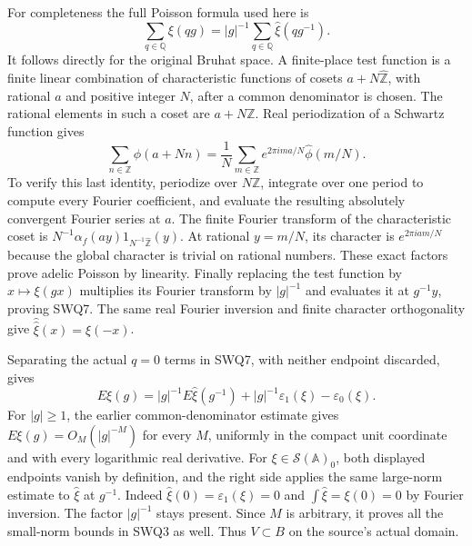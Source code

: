 \documentclass[11pt]{article}
\begin{document}
For completeness the full Poisson formula used here is
\begin{equation}\tag{SWQ7}
 \sum_{q\in\mathbb Q}\xi(qg)
   =|g|^{-1}\sum_{q\in\mathbb Q}\widehat\xi(qg^{-1}).
\end{equation}
It follows directly for the original Bruhat space. A finite-place
test function is a finite linear combination of characteristic
functions of cosets $a+N\widehat{\mathbb Z}$, with rational $a$ and
positive integer $N$, after a common denominator is chosen. The
rational elements in such a coset are $a+N\mathbb Z$. Real
periodization of a Schwartz function gives
\[
 \sum_{n\in\mathbb Z}\phi(a+Nn)
  =\frac1N\sum_{m\in\mathbb Z}
       e^{2\pi i ma/N}\widehat\phi(m/N).
\]
To verify this last identity, periodize over $N\mathbb Z$, integrate
over one period to compute every Fourier coefficient, and evaluate
the resulting absolutely convergent Fourier series at $a$.
The finite Fourier transform of the characteristic coset is
$N^{-1}\alpha_f(ay)1_{N^{-1}\widehat{\mathbb Z}}(y)$.
At rational $y=m/N$, its character is $e^{2\pi i am/N}$ because
the global character is trivial on rational numbers. These exact
factors prove adelic Poisson by linearity. Finally replacing the
test function by $x\mapsto\xi(gx)$ multiplies its Fourier transform
by $|g|^{-1}$ and evaluates it at $g^{-1}y$, proving SWQ7.
The same real Fourier inversion and finite character orthogonality
give $\widehat{\widehat\xi}(x)=\xi(-x)$.

Separating the actual $q=0$ terms in SWQ7, with neither endpoint
discarded, gives
\begin{equation}\tag{SWQ8}
 E\xi(g)=|g|^{-1}E\widehat\xi(g^{-1})
             +|g|^{-1}\varepsilon_1(\xi)-\varepsilon_0(\xi).
\end{equation}
For $|g|\ge1$, the earlier common-denominator estimate gives
$E\xi(g)=O_M(|g|^{-M})$ for every $M$, uniformly in the compact
unit coordinate and with every logarithmic real derivative.
For $\xi\in\mathcal S(\mathbb A)_0$, both displayed endpoints
vanish by definition, and the right side applies the same large-norm
estimate to $\widehat\xi$ at $g^{-1}$. Indeed
$\widehat\xi(0)=\varepsilon_1(\xi)=0$ and
$\int\widehat\xi=\xi(0)=0$ by Fourier inversion.
The factor $|g|^{-1}$ stays present. Since $M$ is arbitrary, it
proves all the small-norm bounds in SWQ3 as well. Thus $V\subset B$
on the source's actual domain.
\end{document}
